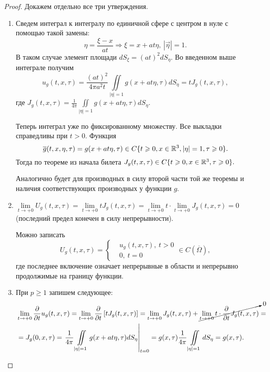 \documentclass[../main.tex]{subfiles}
\begin{document}
\begin{proof} Докажем отдельно все три утверждения.
\begin{enumerate}
\item Сведем интеграл к интегралу по единичной сфере с центром в нуле с помощью такой замены:
\[
\eta = \frac{\xi - x}{at}\Rightarrow \xi = x+at\eta ,\ |\vec{\eta} |=1.
\]
В таком случае элемент площади $dS_{\xi}=(at)^2dS_{\eta}$. Во введенном выше интеграле получим 
\[
u_g(t,x,\tau)=\frac{(at)^2}{4\pi a^2t}\iint\limits_{|\eta |=1}g(x+at\eta ,\tau ) dS_{\eta}=tJ_g(t,x,\tau ),
\]
где $J_g(t,x,\tau )= \frac{1}{4\pi}\iint\limits_{|\eta |=1}g(x+at\eta ,\tau ) dS_{\eta}$.

Теперь интеграл уже по фиксированному множеству. Все выкладки справедливы при $t>0$. Функция
\[
\overline{g}(t,x,\eta ,\tau)=g(x+at\eta, \tau)\in C\{t\geqslant 0, x\in \mathbb{R}^3 , |\eta | = 1, \tau\geqslant 0\}.
\]
Тогда по теореме из начала билета $J_g(t,x,\tau )\in C\{t\geqslant 0, x\in \mathbb{R}^3,\tau\geqslant 0\}.$

Аналогично будет для производных в силу второй части той же теоремы и наличия соответствующих производных у функции $g$.

\item $\lim\limits_{t\rightarrow +0}U_g(t,x,\tau )=\lim\limits_{t\rightarrow +0}tJ_g(t,x,\tau )=\lim\limits_{t\rightarrow +0}t\cdot\lim\limits_{t\rightarrow +0}J_g(t,x,\tau ) = 0$ (последний предел конечен в силу непрерывности).

Можно записать
\[
U_g(t,x,\tau ) = \begin{cases}
&u_g(t,x, \tau ),\ t>0\\
&0,\ t=0
\end{cases} \in C\left(\overline{\Omega} \right),
\]
где последнее включение означает непрерывные в области и непрерывно продолжимые на границу функции.

\item При $p\geq 1$ запишем следующее:
\begin{equation*}
\begin{split}
&\lim\limits_{t\rightarrow +0}\frac{\partial}{\partial t} u_g(t,x, \tau) = \lim\limits_{t\rightarrow +0}\frac{\partial}{\partial t}\left[tJ_g(t,x,\tau )\right]=\lim\limits_{t\rightarrow +0}J_g(t,x,\tau )+\cancelto{0}{\lim\limits_{t\rightarrow +0}t\cdot \frac{\partial}{\partial t}J_g(t,x,\tau )}=\\
&=J_g(0, x, \tau )=\left.\frac{1}{4\pi}\iint\limits_{|\eta |=1}g(x+at\eta ,\tau )dS_{\eta }\right|_{t=0}=g(x, \tau )\frac{1}{4\pi}\iint\limits_{|\eta |=1}dS_{\eta}=g(x,\tau ).
\end{split}
\end{equation*}
\end{enumerate}
\end{proof}
\end{document}
